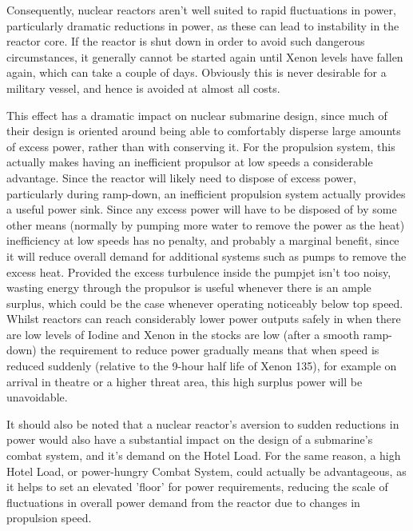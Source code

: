 \documentclass{article}\usepackage[]{graphicx}\usepackage[]{color}
\begin{document}
Consequently, nuclear reactors aren't well suited to rapid fluctuations in power, particularly dramatic reductions in power, as these can lead to instability in the reactor core.  If the reactor is shut down in order to avoid such dangerous circumstances, it generally cannot be started again until Xenon levels have fallen again, which can take a couple of days.  Obviously this is never desirable for a military vessel, and hence is avoided at almost all costs.

This effect has a dramatic impact on nuclear submarine design, since much of their design is oriented around being able to comfortably disperse large amounts of excess power, rather than with conserving it.  For the propulsion system, this actually makes having an inefficient propulsor at low speeds a considerable advantage.  Since the reactor will likely need to dispose of excess power, particularly during ramp-down, an inefficient propulsion system actually provides a useful power sink.  Since any excess power will have to be disposed of by some other means (normally by pumping more water to remove the power as the heat) inefficiency at low speeds has no penalty, and probably a marginal benefit, since it will reduce overall demand for additional systems such as pumps to remove the excess heat.  Provided the excess turbulence inside the pumpjet isn't too noisy, wasting energy through the propulsor is useful whenever there is an ample surplus, which could be the case whenever operating noticeably below top speed. Whilst reactors can reach considerably lower power outputs safely in when there are low levels of Iodine and Xenon in the stocks are low (after a smooth ramp-down) the requirement to reduce power gradually means that when speed is reduced suddenly (relative to the 9-hour half life of Xenon 135), for example on arrival in theatre or a higher threat area, this high surplus power will be unavoidable.

It should also be noted that a nuclear reactor's aversion to sudden reductions in power would also have a substantial impact on the design of a submarine's combat system, and it's demand on the Hotel Load. For the same reason, a high Hotel Load, or power-hungry Combat System, could actually be advantageous, as it helps to set an elevated 'floor' for power requirements, reducing the scale of fluctuations in overall power demand from the reactor due to changes in propulsion speed.
\end{document}
